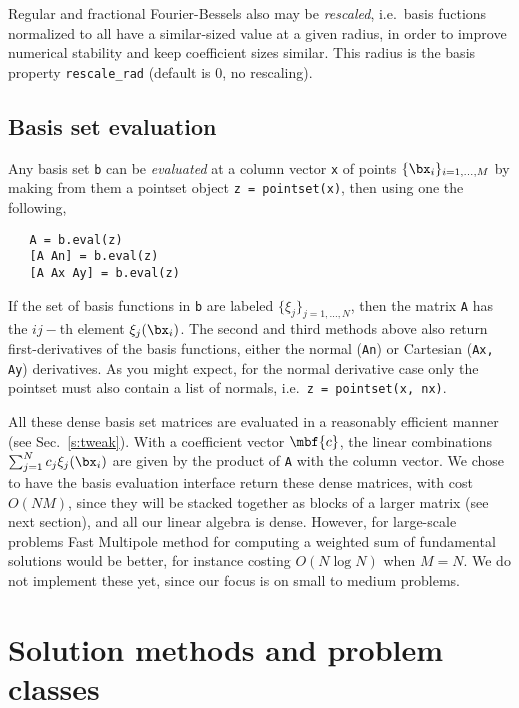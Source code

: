 \documentclass[12pt]{article}
\begin{document}
Regular and fractional Fourier-Bessels also may be {\em rescaled},
i.e.\ basis fuctions normalized to all have a similar-sized value at a given
radius, in order to improve numerical stability and keep coefficient sizes
similar. This radius is the basis property \verb?rescale_rad? (default
is 0, no rescaling).

\subsection{Basis set evaluation}

Any basis set {\tt b} can be {\em evaluated} at a column vector {\tt x}
of points $\{\bx_i\}_{i=1,\ldots,M}$
by making from them a pointset object {\tt z = pointset(x)},
then using one the following,
\begin{verbatim}
   A = b.eval(z)
   [A An] = b.eval(z)
   [A Ax Ay] = b.eval(z)
\end{verbatim}
If the set of basis functions in {\tt b} are labeled
$\{\xi_j\}_{j=1,\ldots,N}$, then
the matrix {\tt A} has the $ij-$th element $\xi_j(\bx_i)$. The
second and third methods above also return first-derivatives of the
basis functions, either the normal ({\tt An}) or Cartesian ({\tt Ax, Ay})
derivatives. As you might expect, for the normal derivative case only
the pointset must also contain a list of normals, i.e.\
 {\tt z = pointset(x, nx)}.

All these dense basis set matrices
are evaluated in a reasonably efficient manner
(see Sec.~\ref{s:tweak}).
With a coefficient vector $\mbf{c}$, the linear combinations
$\sum_{j=1}^N c_j \xi_j(\bx_i)$ are given by the product
of {\tt A} with the column vector.
We chose to have the basis evaluation interface return these dense
matrices, with cost $O(NM)$,
since they will be stacked together as blocks of a larger
matrix (see next section), and all our linear algebra is dense.
However, for large-scale problems Fast Multipole method for computing
a weighted sum of fundamental solutions would be
better, for instance costing $O(N\log N)$ when $M=N$.
We do not implement these yet, since our focus is on small to medium
problems.




\section{Solution methods and problem classes}
\end{document}
